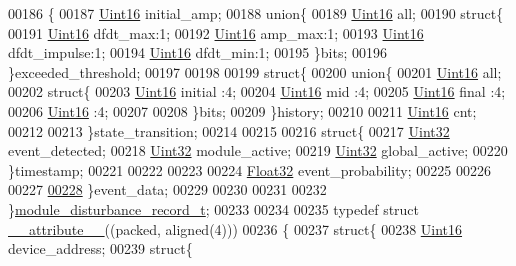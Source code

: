 \begin{DoxyCode}
00186    \{
00187      \hyperlink{a00072_a59a9f6be4562c327cbfb4f7e8e18f08b}{Uint16}                     initial\_amp;
00188     \textcolor{keyword}{union}\{
00189         \hyperlink{a00072_a59a9f6be4562c327cbfb4f7e8e18f08b}{Uint16} all;
00190         \textcolor{keyword}{struct}\{
00191             \hyperlink{a00072_a59a9f6be4562c327cbfb4f7e8e18f08b}{Uint16} dfdt\_max:1;
00192             \hyperlink{a00072_a59a9f6be4562c327cbfb4f7e8e18f08b}{Uint16} amp\_max:1;
00193             \hyperlink{a00072_a59a9f6be4562c327cbfb4f7e8e18f08b}{Uint16} dfdt\_impulse:1;
00194             \hyperlink{a00072_a59a9f6be4562c327cbfb4f7e8e18f08b}{Uint16} dfdt\_min:1;
00195         \}bits;
00196     \}exceeded\_threshold;
00197 
00198 
00199     \textcolor{keyword}{struct}\{
00200     \textcolor{keyword}{union}\{
00201         \hyperlink{a00072_a59a9f6be4562c327cbfb4f7e8e18f08b}{Uint16} all;
00202         \textcolor{keyword}{struct}\{
00203             \hyperlink{a00072_a59a9f6be4562c327cbfb4f7e8e18f08b}{Uint16} initial  :4;
00204             \hyperlink{a00072_a59a9f6be4562c327cbfb4f7e8e18f08b}{Uint16} mid      :4;
00205             \hyperlink{a00072_a59a9f6be4562c327cbfb4f7e8e18f08b}{Uint16} \textcolor{keyword}{final}    :4;
00206             \hyperlink{a00072_a59a9f6be4562c327cbfb4f7e8e18f08b}{Uint16}          :4;
00207   
00208         \}bits;
00209     \}history;
00210 
00211     \hyperlink{a00072_a59a9f6be4562c327cbfb4f7e8e18f08b}{Uint16} cnt;
00212 
00213     \}state\_transition;
00214 
00215 
00216     \textcolor{keyword}{struct}\{
00217      \hyperlink{a00072_aba99025e657f892beb7ff31cecf64653}{Uint32}                    event\_detected;
00218      \hyperlink{a00072_aba99025e657f892beb7ff31cecf64653}{Uint32}                    module\_active;
00219      \hyperlink{a00072_aba99025e657f892beb7ff31cecf64653}{Uint32}                    global\_active;
00220     \}timestamp;
00221 
00222 
00223 
00224     \hyperlink{a00072_a87d38f886e617ced2698fc55afa07637}{Float32}                    event\_probability;
00225 
00226     
00227 
\hypertarget{a00022_source_l00228}{}\hyperlink{a00028_a8c0bda69e71ef674e60da47ad0be9ab0}{00228}     \}event\_data;
00229 
00230 
00231 
00232 \}\hyperlink{a00028}{module\_disturbance\_record\_t};
00233 
00234 
00235 \textcolor{keyword}{typedef} \textcolor{keyword}{struct }\hyperlink{a00022_ad8187eb7fe09751a387e3dcb11c51565}{\_\_attribute\_\_}((packed, aligned(4)))
00236 \{
00237     \textcolor{keyword}{struct}\{
00238         \hyperlink{a00072_a59a9f6be4562c327cbfb4f7e8e18f08b}{Uint16}                              device\_address;
00239         \textcolor{keyword}{struct}\{

\end{DoxyCode}
